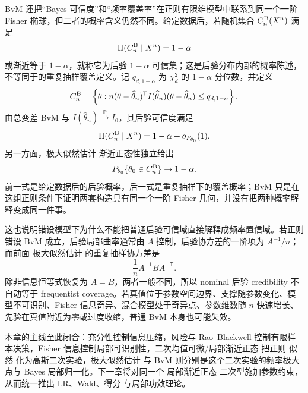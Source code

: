 \begin{corollary}
BvM 还把“Bayes 可信度”和“频率覆盖率”在正则有限维模型中联系到同一个一阶 Fisher 椭球，但二者的概率含义仍然不同。给定数据后，若随机集合 $C_n^{\rm B}(X^n)$ 满足
\[
 \Pi(C_n^{\rm B}\mid X^n)=1-\alpha
\]
或渐近等于 $1-\alpha$，就称它为后验 $1-\alpha$ 可信集；这是后验分布内部的概率陈述，不等同于的重复抽样覆盖定义。记 $q_{d,1-\alpha}$ 为 $\chi^2_d$ 的 $1-\alpha$ 分位数，并定义
\begin{equation*}C_n^{\rm B}
 =\left\{
 \theta:
 n(\theta-\widehat\theta_n)^{\mathsf T}
 I(\widehat\theta_n)
 (\theta-\widehat\theta_n)
 \le q_{d,1-\alpha}
 \right\}.
\end{equation*}
由总变差 BvM 与 $I(\widehat\theta_n)\xrightarrow{\mathbb P} I_0$，其后验可信度满足
\[
 \Pi(C_n^{\rm B}\mid X^n)=1-\alpha+o_{P_{\theta_0}}(1).
\]
另一方面，极大似然估计 渐近正态性独立给出
\[
 P_{\theta_0}\{\theta_0\in C_n^{\rm B}\}
 \to1-\alpha.
\]
前一式是给定数据后的后验概率，后一式是重复抽样下的覆盖概率；BvM 只是在这组正则条件下证明两套构造具有同一个一阶 Fisher 几何，并没有把两种概率解释变成同一件事。
\end{corollary}

\begin{note}[错设或奇异情形不能混用概率解释]
这也说明错设模型下为什么不能把普通后验可信域直接解释成频率置信域。若正则错设 BvM 成立，后验局部曲率通常由 $A$ 控制，后验协方差的一阶项为 $A^{-1}/n$；而前面 极大似然估计 的重复抽样协方差是
\[
 \frac1nA^{-1}BA^{-\mathsf T}.
\]
除非信息恒等式恢复为 $A=B$，两者一般不同，所以 nominal 后验 credibility 不自动等于 frequentist coverage。若真值位于参数空间边界、支撑随参数变化、模型不可识别、Fisher 信息奇异、混合模型处于奇异点、参数维数随 $n$ 快速增长、先验在真值附近为零或过度收缩，普通 BvM 本身也可能失效。
\end{note}

本章的主线至此闭合：充分性控制信息压缩，风险与 Rao--Blackwell 控制有限样本决策，Fisher 信息控制局部可识别性，二次均值可微/局部渐近正态 把正则 似然 化为高斯二次实验，极大似然估计 与 BvM 则分别是这个二次实验的频率极大点与 Bayes 局部归一化。下一章将对同一个 局部渐近正态 二次型施加参数约束，从而统一推出 LR、Wald、得分 与局部功效理论。










